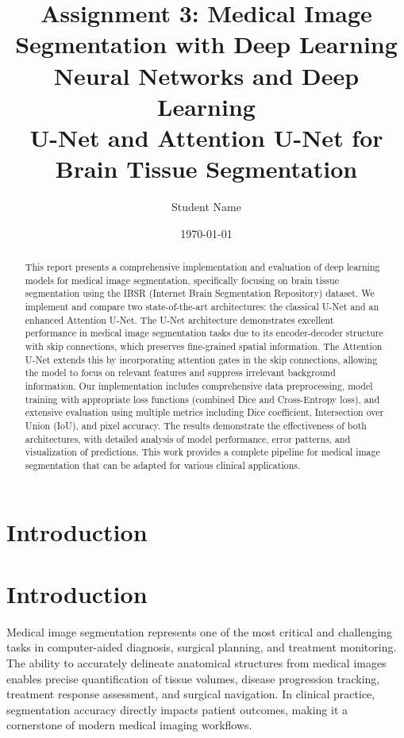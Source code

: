 \documentclass[12pt,a4paper]{article}
\title{\textbf{Assignment 3: Medical Image Segmentation with Deep Learning}\\
\large Neural Networks and Deep Learning\\
\large U-Net and Attention U-Net for Brain Tissue Segmentation}
\author{Student Name}
\date{\today}
\begin{document}
\maketitle

\begin{abstract}
This report presents a comprehensive implementation and evaluation of deep learning models for medical image segmentation, specifically focusing on brain tissue segmentation using the IBSR (Internet Brain Segmentation Repository) dataset. We implement and compare two state-of-the-art architectures: the classical U-Net and an enhanced Attention U-Net. The U-Net architecture demonstrates excellent performance in medical image segmentation tasks due to its encoder-decoder structure with skip connections, which preserves fine-grained spatial information. The Attention U-Net extends this by incorporating attention gates in the skip connections, allowing the model to focus on relevant features and suppress irrelevant background information. Our implementation includes comprehensive data preprocessing, model training with appropriate loss functions (combined Dice and Cross-Entropy loss), and extensive evaluation using multiple metrics including Dice coefficient, Intersection over Union (IoU), and pixel accuracy. The results demonstrate the effectiveness of both architectures, with detailed analysis of model performance, error patterns, and visualization of predictions. This work provides a complete pipeline for medical image segmentation that can be adapted for various clinical applications.
\end{abstract}

\tableofcontents
\newpage

\section{Introduction}

\section{Introduction}

Medical image segmentation represents one of the most critical and challenging tasks in computer-aided diagnosis, surgical planning, and treatment monitoring. The ability to accurately delineate anatomical structures from medical images enables precise quantification of tissue volumes, disease progression tracking, treatment response assessment, and surgical navigation. In clinical practice, segmentation accuracy directly impacts patient outcomes, making it a cornerstone of modern medical imaging workflows.
\end{document}
